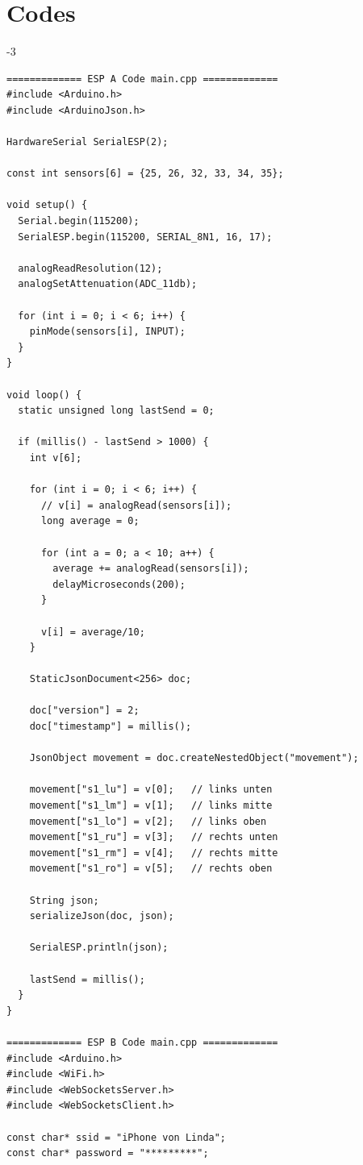 \section*{Codes}
\begin{relsize}{-3}
  \begin{multicols}{2}
    \begin{verbatim}
============= ESP A Code main.cpp =============
#include <Arduino.h>
#include <ArduinoJson.h>

HardwareSerial SerialESP(2);

const int sensors[6] = {25, 26, 32, 33, 34, 35};

void setup() {
  Serial.begin(115200); 
  SerialESP.begin(115200, SERIAL_8N1, 16, 17);

  analogReadResolution(12);       
  analogSetAttenuation(ADC_11db); 

  for (int i = 0; i < 6; i++) {
    pinMode(sensors[i], INPUT);
  }
}

void loop() {
  static unsigned long lastSend = 0;
  
  if (millis() - lastSend > 1000) {
    int v[6];

    for (int i = 0; i < 6; i++) {
      // v[i] = analogRead(sensors[i]);
      long average = 0;

      for (int a = 0; a < 10; a++) {
        average += analogRead(sensors[i]);
        delayMicroseconds(200);
      }

      v[i] = average/10;
    }

    StaticJsonDocument<256> doc;

    doc["version"] = 2;
    doc["timestamp"] = millis();

    JsonObject movement = doc.createNestedObject("movement");

    movement["s1_lu"] = v[0];   // links unten
    movement["s1_lm"] = v[1];   // links mitte
    movement["s1_lo"] = v[2];   // links oben
    movement["s1_ru"] = v[3];   // rechts unten
    movement["s1_rm"] = v[4];   // rechts mitte
    movement["s1_ro"] = v[5];   // rechts oben

    String json;
    serializeJson(doc, json);  

    SerialESP.println(json);

    lastSend = millis();
  }
}

============= ESP B Code main.cpp =============
#include <Arduino.h>
#include <WiFi.h>
#include <WebSocketsServer.h>
#include <WebSocketsClient.h>

const char* ssid = "iPhone von Linda";
const char* password = "*********";


\end{verbatim}
\end{multicols}
\end{relsize}
